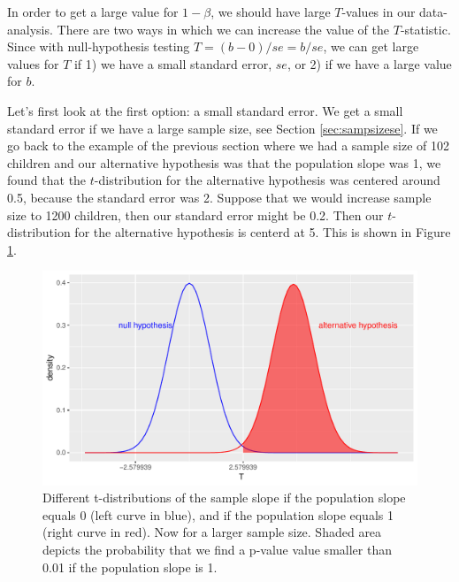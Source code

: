 \documentclass[]{report}\usepackage[]{graphicx}\usepackage[]{color}
\makeatletter
\def\maxwidth{ %
  \ifdim\Gin@nat@width>\linewidth
    \linewidth
  \else
    \Gin@nat@width
  \fi
}
\newenvironment{knitrout}{}{} %
\makeatother
\begin{document}
In order to get a large value for $1-\beta$, we should have large $T$-values in our data-analysis. There are two ways in which we can increase the value of the $T$-statistic. Since with null-hypothesis testing $T=(b-0)/se=b/se$, we can get large values for $T$ if 1) we have a small standard error, $se$, or 2) if we have a large value for $b$. 


Let's first look at the first option: a small standard error. We get a small standard error if we have a large sample size, see Section \ref{sec:sampsizese}. If we go back to the example of the previous section where we had a sample size of 102 children and our alternative hypothesis was that the population slope was 1, we found that the $t$-distribution for the alternative hypothesis was centered around 0.5, because the standard error was 2. Suppose that we would increase sample size to 1200 children, then our standard error might be 0.2. Then our $t$-distribution for the alternative hypothesis is centerd at 5. This is shown in Figure \ref{fig:inf_24}.




\begin{knitrout}
\color{fgcolor}\begin{figure}

{\centering \includegraphics[width=\maxwidth]{figure/inf_24-1} 

}

\caption[Different t-distributions of the sample slope if the population slope equals 0 (left curve in blue), and if the population slope equals 1 (right curve in red)]{Different t-distributions of the sample slope if the population slope equals 0 (left curve in blue), and if the population slope equals 1 (right curve in red). Now for a larger sample size. Shaded area depicts the probability that we find a p-value value smaller than 0.01 if the population slope is 1.}\label{fig:inf_24}
\end{figure}


\end{knitrout}
\end{document}
